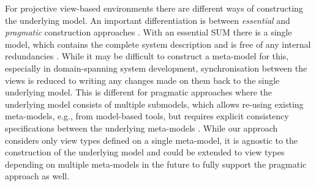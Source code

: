 For projective view-based environments there are different ways of constructing the underlying model.
An important differentiation is between \emph{essential} and \emph{pragmatic} construction approaches \autocite{atkinson_fundamental_2015}.
With an essential SUM  there is a single model, which contains the complete system description and is free of any internal redundancies \autocite{atkinson_orthographic_2010}.
While it may be difficult to construct a meta-model for this, especially in domain-spanning system development, synchronisation between the views is reduced to writing any changes made on them back to the single underlying model.
This is different for pragmatic approaches where the underlying model consists of multiple submodels, which allows re-using existing meta-models, e.g., from model-based tools, but requires explicit consistency specifications between the underlying meta-models \autocite{klare_enabling_2021}.
While our approach considers only view types defined on a single meta-model, it is agnostic to the construction of the underlying model and could be extended to view types depending on multiple meta-models in the future to fully support the pragmatic approach as well.

\begin{comment}
\Textcite{atkinson_fundamental_2015} differentiate between \emph{essential} and \emph{pragmatic} SUMs.
With an essential SUM there is a single model, which contains the complete system description and is free of any internal redundancies.
For the synchronization between the views, this is the easiest solution, because the views are simply required to write any changes made on them back to the SUM.
Subsequently generated views are then automatically consistent.
An example of an approach employing an essential SUM is OSM by \textcite{atkinson_orthographic_2010}.
In contrast to a single redundancy-free model, there are also pragmatic approaches where the underlying model consists of multiple submodels.
The main benefit of pragmatic approaches is the construction of the underlying model.
While it is difficult to create a single redundancy-free \metamodel, especially for a domain-spanning system, pragmatic SUMs allow the integration of already available \metamodels, e.g., from development tools used in the various domains.
Additional effort is, however, necessary to keep the models consistent.
One framework for constructing pragmatic SUMs, here called virtual SUMs (V-SUMs), is Vitruvius \autocite{klare_enabling_2021}.
\end{comment}

